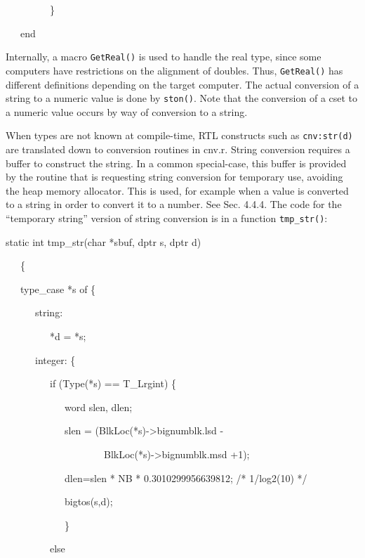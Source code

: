 \ \ \ \ \ \ \ \ \ \}

\ \ \ end

Internally, a macro \texttt{GetReal()} is used to handle the real
type, since some computers have restrictions on the alignment of
doubles. Thus, \texttt{GetReal()} has different definitions depending
on the target computer. The actual conversion of a string to a numeric
value is done by \texttt{ston()}. Note that the conversion of a cset
to a numeric value occurs by way of conversion to a string.

When types are not known at compile-time, RTL constructs such as
\texttt{cnv:str(d)} are translated down to conversion routines in
cnv.r. String conversion requires a buffer to construct the string. In
a common special-case, this buffer is provided by the routine that is
requesting string conversion for temporary use, avoiding the heap
memory allocator.  This is used, for example when a value is converted
to a string in order to convert it to a number. See Sec. 4.4.4. The
code for the ``temporary string'' version of string conversion is in a
function \texttt{tmp\_str()}:

{\ttfamily\mdseries
static int tmp\_str(char *sbuf, dptr s, dptr d)}

{\ttfamily\mdseries
\ \ \ \{}

{\ttfamily\mdseries
\ \ \ type\_case *s of \{}

{\ttfamily\mdseries
\ \ \ \ \ \ string:}

{\ttfamily\mdseries
\ \ \ \ \ \ \ \ \ *d = *s;}

{\ttfamily\mdseries
\ \ \ \ \ \ integer: \{}

{\ttfamily\mdseries
\ \ \ \ \ \ \ \ \ if (Type(*s) == T\_Lrgint) \{}

{\ttfamily\mdseries
\ \ \ \ \ \ \ \ \ \ \ \ word slen, dlen;}

{\ttfamily\mdseries
\ \ \ \ \ \ \ \ \ \ \ \ slen = (BlkLoc(*s)-{\textgreater}bignumblk.lsd -}

{\ttfamily\mdseries
\ \ \ \ \ \ \ \ \ \ \ \ \ \ \ \ \ \ \ \ BlkLoc(*s)-{\textgreater}bignumblk.msd +1);}

{\ttfamily\mdseries
\ \ \ \ \ \ \ \ \ \ \ \ dlen=slen * NB * 0.3010299956639812; /* 1/log2(10) */}

{\ttfamily\mdseries
\ \ \ \ \ \ \ \ \ \ \ \ bigtos(s,d);}

{\ttfamily\mdseries
\ \ \ \ \ \ \ \ \ \ \ \ \}}

{\ttfamily\mdseries
\ \ \ \ \ \ \ \ \ else}

